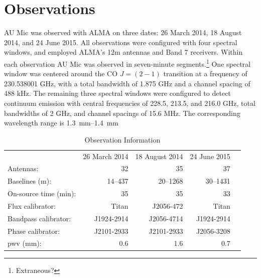 \documentclass[12pt,oneside]{book}
\begin{document}
% 
% 
% 
\mainmatter 
% 

\chapter{Observations}
\label{chap: observations}
AU Mic was observed  with ALMA on three dates: 26 March 2014, 18 August 2014, and 24 June 2015. 
All observations were configured with four spectral windows, and employed ALMA's 12m antennas and Band 7 receivers. 
Within each observation AU Mic was observed in seven-minute segments.\footnote{Extraneous?}
One spectral window was centered around the CO $J = (2-1)$ transition at a frequency of 230.538001 GHz, with a total bandwidth of 1.875 GHz and a channel spacing of 488 kHz.
The remaining three spectral windows were configured to detect continuum emission with central frequencies of 228.5, 213.5, and 216.0 GHz, total bandwidths of 2 GHz, and channel spacings of 15.6 MHz. The corresponding wavelength range is \SIrange{1.3}{1.4}{\mm}

\begin{table}	
  \centering
	\caption{Observation Information}
  \label{tab:observations}
  \begin{tabular}{lrrrr}
    \toprule
    & 26 March 2014 & 18 August 2014 & 24 June 2015 \\
    \cmidrule(lr){2-4}
    Antennas: & 32 & 35 & 37 \\
    Baselines (m): & 14--437 & 20--1268 & 30--1431 \\
    On-source time (min): & 35 & 35 & 33 \\
    Flux calibrator: & Titan & J2056-472 & Titan \\
    Bandpass calibrator: & J1924-2914 & J2056-4714 & J1924-2914 \\
    Phase calibrator: & J2101-2933 & J2101-2933 & J2056-3208  \\
    pwv (mm): & 0.6 & 1.6 & 0.7 \\
    \bottomrule
  \end{tabular}
\end{table}
\end{document}
